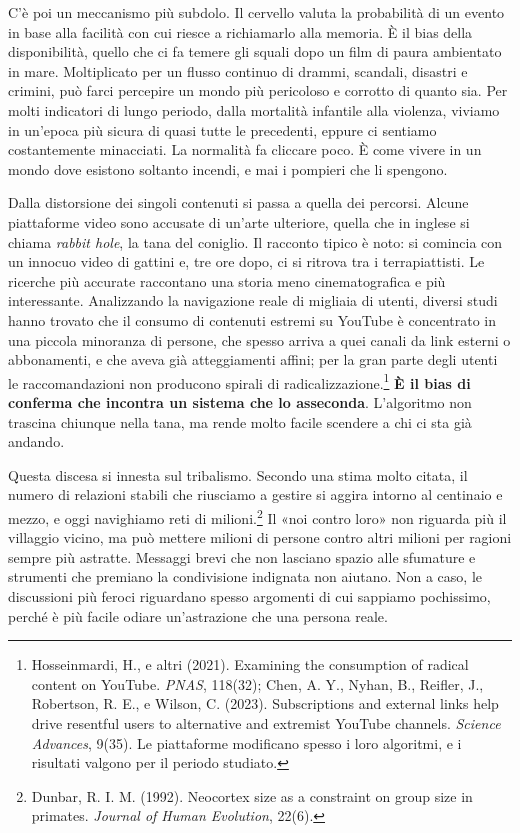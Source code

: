 C'è poi un meccanismo più subdolo. Il cervello valuta la probabilità di un evento in base alla facilità con cui riesce a richiamarlo alla memoria. È il bias della disponibilità, quello che ci fa temere gli squali dopo un film di paura ambientato in mare. Moltiplicato per un flusso continuo di drammi, scandali, disastri e crimini, può farci percepire un mondo più pericoloso e corrotto di quanto sia. Per molti indicatori di lungo periodo, dalla mortalità infantile alla violenza, viviamo in un'epoca più sicura di quasi tutte le precedenti, eppure ci sentiamo costantemente minacciati. La normalità fa cliccare poco. È come vivere in un mondo dove esistono soltanto incendi, e mai i pompieri che li spengono.

Dalla distorsione dei singoli contenuti si passa a quella dei percorsi. Alcune piattaforme video sono accusate di un'arte ulteriore, quella che in inglese si chiama \textit{rabbit hole}, la tana del coniglio. Il racconto tipico è noto: si comincia con un innocuo video di gattini e, tre ore dopo, ci si ritrova tra i terrapiattisti. Le ricerche più accurate raccontano una storia meno cinematografica e più interessante. Analizzando la navigazione reale di migliaia di utenti, diversi studi hanno trovato che il consumo di contenuti estremi su YouTube è concentrato in una piccola minoranza di persone, che spesso arriva a quei canali da link esterni o abbonamenti, e che aveva già atteggiamenti affini; per la gran parte degli utenti le raccomandazioni non producono spirali di radicalizzazione.\footnote{Hosseinmardi, H., e altri (2021). Examining the consumption of radical content on YouTube. \textit{PNAS}, 118(32); Chen, A. Y., Nyhan, B., Reifler, J., Robertson, R. E., e Wilson, C. (2023). Subscriptions and external links help drive resentful users to alternative and extremist YouTube channels. \textit{Science Advances}, 9(35). Le piattaforme modificano spesso i loro algoritmi, e i risultati valgono per il periodo studiato.} \textbf{È il bias di conferma che incontra un sistema che lo asseconda}. L'algoritmo non trascina chiunque nella tana, ma rende molto facile scendere a chi ci sta già andando.

Questa discesa si innesta sul tribalismo. Secondo una stima molto citata, il numero di relazioni stabili che riusciamo a gestire si aggira intorno al centinaio e mezzo, e oggi navighiamo reti di milioni.\footnote{Dunbar, R. I. M. (1992). Neocortex size as a constraint on group size in primates. \textit{Journal of Human Evolution}, 22(6).} Il «noi contro loro» non riguarda più il villaggio vicino, ma può mettere milioni di persone contro altri milioni per ragioni sempre più astratte. Messaggi brevi che non lasciano spazio alle sfumature e strumenti che premiano la condivisione indignata non aiutano. Non a caso, le discussioni più feroci riguardano spesso argomenti di cui sappiamo pochissimo, perché è più facile odiare un'astrazione che una persona reale.

